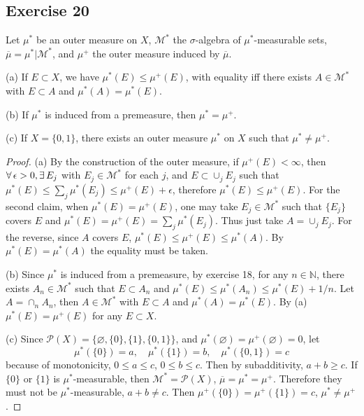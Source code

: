 \subsection*{Exercise 20}
Let $\mu^*$ be an outer measure on $X$, $\mathcal{M}^*$ the $\sigma$-algebra of $\mu^*$-measurable sets, $\overline{\mu}=\mu^*|\mathcal{M}^*$, and $\mu^+$ the outer measure induced by $\overline{\mu}$.
\par (a) If $E\subset X$, we have $\mu^*(E)\le\mu^+(E)$, with equality iff there exists $A\in\mathcal{M}^*$ with $E\subset A$ and $\mu^*(A)=\mu^*(E)$.
\par (b) If $\mu^*$ is induced from a premeasure, then $\mu^*=\mu^+$.
\par (c) If $X=\{0,1\}$, there exists an outer measure $\mu^*$ on $X$ such that $\mu^*\neq\mu^+$.
\begin{proof}
    \par (a) By the construction of the outer measure, if $\mu^+(E)<\infty$, then $\forall\,\epsilon>0, \exists\, E_j$ with $E_j\in\mathcal{M}^*$ for each $j$, and $E\subset\cup_jE_j$ such that $\mu^*(E)\le\sum_j\mu^*(E_j)\le\mu^+(E)+\epsilon$, therefore $\mu^*(E)\le\mu^+(E)$. For the second claim, when $\mu^*(E)=\mu^+(E)$, one may take $E_j\in\mathcal{M}^*$ such that $\{E_j\}$ covers $E$ and $\mu^*(E)=\mu^+(E)=\sum_j\mu^*(E_j)$. Thus just take $A=\cup_jE_j$. For the reverse, since $A$ covers $E$, $\mu^*(E)\le\mu^+(E)\le\mu^*(A)$. By $\mu^*(E)=\mu^*(A)$ the equality must be taken.
    \par (b) Since $\mu^*$ is induced from a premeasure, by exercise 18, for any $n\in\mathbb{N}$, there exists $A_n\in\mathcal{M}^*$ such that $E\subset A_n$ and $\mu^*(E)\le\mu^*(A_n)\le\mu^*(E)+1/n$. Let $A=\cap_nA_n$, then $A\in\mathcal{M}^*$ with $E\subset A$ and $\mu^*(A)=\mu^*(E)$. By (a) $\mu^*(E)=\mu^+(E)$ for any $E\subset X$.
    \par (c) Since $\mathcal{P}(X)=\{\varnothing,\{0\},\{1\},\{0,1\}\}$, and $\mu^*(\varnothing)=\mu^+(\varnothing)=0$, let 
    $$
    \mu^*(\{0\})=a,\quad \mu^*(\{1\})=b,\quad \mu^*(\{0,1\})=c
    $$
    because of monotonicity, $0\le a\le c$, $0\le b\le c$. Then by subadditivity, $a+b\ge c$. If $\{0\}$ or $\{1\}$ is $\mu^*$-measurable, then $\mathcal{M}^*=\mathcal{P}(X)$, $\overline{\mu}=\mu^*=\mu^+$. Therefore they must not be $\mu^*$-measurable, $a+b\neq c$. Then $\mu^+(\{0\})=\mu^+(\{1\})=c$, $\mu^*\neq\mu^+$.
\end{proof}
